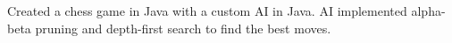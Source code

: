 \documentclass[letterpaper]{deedy-resume-modified} %
\begin{document}
\begin{minipage}[t]{0.66\textwidth}
\sectionspace %



Created a chess game in Java with a custom AI in Java.   AI implemented alpha-beta pruning and depth-first search to find the best moves.


\sectionspace %

\end{minipage} %

\end{document}
